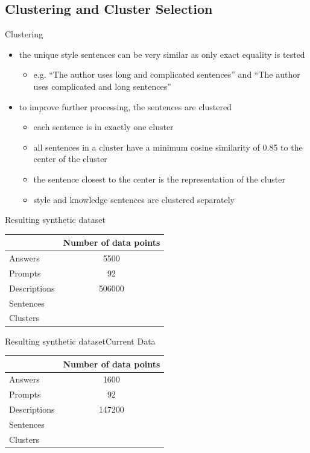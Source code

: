 \documentclass[]{beamer}
\begin{document}
\subsection{Clustering and Cluster Selection}
\begin{frame}{Clustering}
  \begin{itemize}
    \item the unique style sentences can be very similar as only exact equality is tested
          \begin{itemize}
            \item e.g. \enquote{The author uses long and complicated sentences} and \enquote{The author uses complicated and long sentences}
          \end{itemize}
    \item to improve further processing, the sentences are clustered
          \pause
          \begin{itemize}
            \item each sentence is in exactly one cluster
            \item all sentences in a cluster have a minimum cosine similarity of \num{0.85} to the center of the cluster
            \item the sentence closest to the center is the representation of the cluster
            \item style and knowledge sentences are clustered separately
          \end{itemize}
  \end{itemize}
\end{frame}

\begin{frame}{Resulting synthetic dataset}
  \begin{tabular}{lS}
    \toprule
                 & {Number of data points} \\ \midrule
    Answers      & 5500                    \\
    Prompts      & 92                      \\
    Descriptions & 506000                  \\
    Sentences    &          \\
    Clusters     &          \\ \bottomrule
  \end{tabular}
\end{frame}
\begin{frame}{Resulting synthetic dataset}{Current Data}
  \begin{tabular}{lS}
    \toprule
                 & {Number of data points} \\ \midrule
    Answers      & 1600                    \\
    Prompts      & 92                      \\
    Descriptions & 147200                  \\
    Sentences    &           \\
    Clusters     &           \\ \bottomrule
  \end{tabular}
\end{frame}
\end{document}
